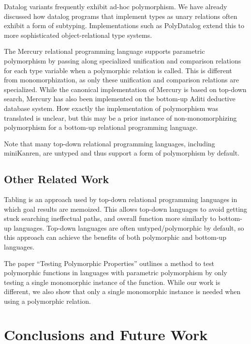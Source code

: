 \documentclass{report}
\theoremstyle{definition}
\begin{document}
Datalog variants frequently exhibit ad-hoc polymorphism.
We have already discussed how datalog programs that implement types as unary relations often exhibit a form of subtyping.
Implementations such as PolyDatalog\cite{atzeni2010} extend this to more sophisticated object-relational type systems.

The Mercury\cite{somogyi1996} relational programming language supports parametric polymorphism by passing along specialized unification and comparison relations for each type variable
when a polymorphic relation is called.
This is different from monomorphization, as only these unification and comparison relations are specialized.
While the canonical implementation of Mercury is based on top-down search,
Mercury has also been implemented on the bottom-up Aditi\cite{vaghanl1994} deductive database system.
How exactly the implementation of polymorphism was translated is unclear,
but this may be a prior instance of non-monomorphizing polymorphism for a bottom-up relational programming language.

Note that many top-down relational programming languages, including miniKanren, are untyped and thus support a form of polymorphism by default.

\section{Other Related Work}

Tabling\cite{tamaki1986} is an approach used by top-down relational programming languages in which goal results are memoized.
This allows top-down languages to avoid getting stuck searching ineffectual paths, and overall function more similarly to bottom-up languages.
Top-down languages are often untyped/polymorphic by default, so this approach can achieve the benefits of both polymorphic and bottom-up languages.

The paper ``Testing Polymorphic Properties''\cite{bernardy2010} outlines a method to test polymorphic functions in languages with parametric polymorphism
by only testing a single monomorphic instance of the function.
While our work is different, we also show that only a single monomorphic instance is needed when using a polymorphic relation.

\chapter{Conclusions and Future Work}
\end{document}
